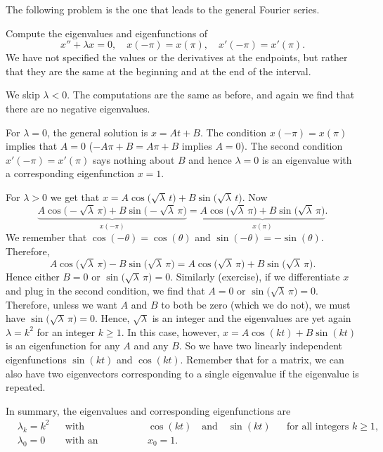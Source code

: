 The following problem is the one that leads to the general Fourier
series.

\begin{example} \label{bvp-periodic:example}
Compute the 
eigenvalues and eigenfunctions of
\begin{equation*}
x'' + \lambda x = 0, \quad x(-\pi) = x(\pi), \quad x'(-\pi) = x'(\pi) .
\end{equation*}
We have not specified the values or the derivatives
at the endpoints, but rather that they are the same at the beginning and
at the end of the interval.

We skip $\lambda < 0$.  The computations are the same as before,
and again we find
that there are no negative eigenvalues.

For $\lambda = 0$, the general solution is $x = At + B$.  The condition
$x(-\pi) = x(\pi)$ implies that $A=0$ ($-A\pi + B = A\pi +B$ implies $A=0$).
The second condition $x'(-\pi) = x'(\pi)$ says nothing about $B$ and hence
$\lambda=0$ is an eigenvalue with a corresponding eigenfunction $x=1$.

For $\lambda > 0$ we get that
$x = A \cos \bigl( \sqrt{\lambda}\, t \bigr)
+ B \sin \bigl( \sqrt{\lambda}\, t\bigr)$.
Now
\begin{equation*}
\underbrace{A \cos \bigl(-\sqrt{\lambda}\, \pi\bigr)
+ B \sin \bigl(-\sqrt{\lambda}\,
\pi\bigr)}_{x(-\pi)}
=
\underbrace{A \cos \bigl(  \sqrt{\lambda}\, \pi \bigr)
+ B \sin \bigl( \sqrt{\lambda}\,
\pi\bigr)}_{x(\pi)} .
\end{equation*}
We remember that $\cos (- \theta) = \cos (\theta)$ and
$\sin (-\theta) = - \sin (\theta)$.  Therefore,
\begin{equation*}
A \cos \bigl(\sqrt{\lambda}\, \pi\bigr)
- B \sin \bigl( \sqrt{\lambda}\, \pi\bigr)
=
A \cos \bigl(\sqrt{\lambda}\, \pi\bigr)
+ B \sin \bigl( \sqrt{\lambda}\, \pi\bigr).
\end{equation*}
Hence either $B=0$ or $\sin \bigl( \sqrt{\lambda}\, \pi\bigr) = 0$.
Similarly (exercise), if we differentiate $x$ and plug in the second
condition, we find that $A=0$ or $\sin \bigl( \sqrt{\lambda}\, \pi\bigr) = 0$.
Therefore, unless we want $A$ and $B$ to both be zero (which we do not),
we must have $\sin \bigl( \sqrt{\lambda}\, \pi \bigr) = 0$.  Hence, $\sqrt{\lambda}$
is an integer and the eigenvalues are yet again $\lambda = k^2$ for
an integer $k \geq 1$.  In this case, however, 
$x = A \cos (k t) + B \sin (k t)$ is an eigenfunction for any $A$ and any $B$.
So we have two linearly independent eigenfunctions $\sin (kt)$ and $\cos (kt)$.
Remember that for a matrix, we can also have two eigenvectors
corresponding to a single eigenvalue if the eigenvalue is repeated.

In summary, the eigenvalues and corresponding eigenfunctions are
\begin{align*}
& \lambda_k = k^2 & & \text{with eigenfunctions} & &
\cos (k t) \quad \text{and}\quad  \sin (k t)
 & & \text{for all integers } k \geq 1 , \\
& \lambda_0 = 0 & & \text{with an eigenfunction} & & x_0 = 1.
\end{align*}
\end{example}

